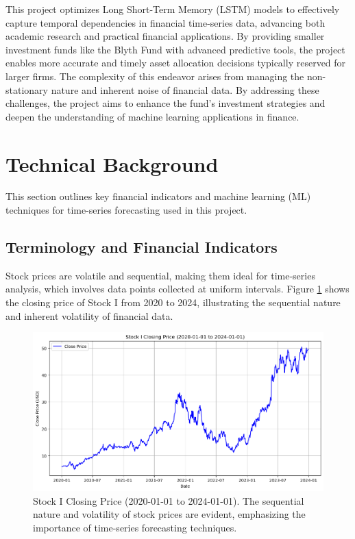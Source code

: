 \documentclass[10pt,twocolumn]{article}
\begin{document}
This project optimizes Long Short-Term Memory (LSTM) models to effectively capture temporal dependencies in financial time-series data, advancing both academic research and practical financial applications. By providing smaller investment funds like the Blyth Fund with advanced predictive tools, the project enables more accurate and timely asset allocation decisions typically reserved for larger firms. The complexity of this endeavor arises from managing the non-stationary nature and inherent noise of financial data. By addressing these challenges, the project aims to enhance the fund’s investment strategies and deepen the understanding of machine learning applications in finance.

\section{Technical Background}

This section outlines key financial indicators and machine learning (ML) techniques for time-series forecasting used in this project.

\subsection{Terminology and Financial Indicators}

Stock prices are volatile and sequential, making them ideal for time-series analysis, which involves data points collected at uniform intervals. Figure \ref{fig:stock_i_close_price} shows the closing price of Stock I from 2020 to 2024, illustrating the sequential nature and inherent volatility of financial data.

\begin{figure}[htbp]
    \centering
    \includegraphics[width=\linewidth]{Stock_I_Close_Price.png}
    \caption{Stock I Closing Price (2020-01-01 to 2024-01-01). The sequential nature and volatility of stock prices are evident, emphasizing the importance of time-series forecasting techniques.}
    \label{fig:stock_i_close_price}
\end{figure}
\end{document}
